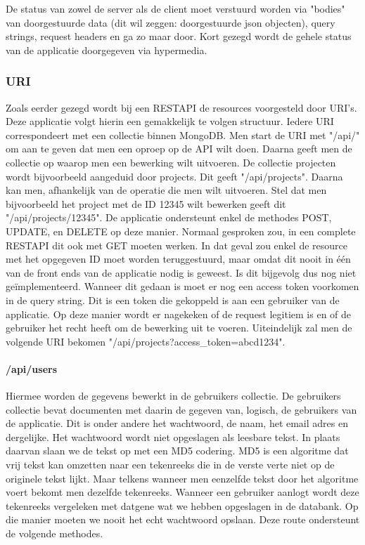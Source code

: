 \documentclass[a4paper,11pt]{article}
\begin{document}
De status van zowel de server als de client moet verstuurd worden via "bodies" van doorgestuurde data (dit wil zeggen: doorgestuurde json objecten), query strings, request headers en ga zo maar door. Kort gezegd wordt de gehele status van de applicatie doorgegeven via hypermedia.

\subsubsection{URI}
Zoals eerder gezegd wordt bij een RESTAPI de resources voorgesteld door URI's. Deze applicatie volgt hierin een gemakkelijk te volgen structuur. Iedere URI correspondeert met een collectie binnen MongoDB. Men start de URI met "/api/" om aan te geven dat men een oproep op de API wilt doen. Daarna geeft men de collectie op waarop men een bewerking wilt uitvoeren. De collectie projecten wordt bijvoorbeeld aangeduid door projects. Dit geeft "/api/projects". Daarna kan men, afhankelijk van de operatie die men wilt uitvoeren. Stel dat men bijvoorbeeld het project met de ID 12345 wilt bewerken geeft dit "/api/projects/12345". De applicatie ondersteunt enkel de methodes POST, UPDATE, en DELETE op deze manier. Normaal gesproken zou, in een complete RESTAPI dit ook met GET moeten werken. In dat geval zou enkel de resource met het opgegeven ID moet worden teruggestuurd, maar omdat dit nooit in één van de front ends van de applicatie nodig is geweest. Is dit bijgevolg dus nog niet geïmplementeerd. Wanneer dit gedaan is moet er nog een access token voorkomen in de query string. Dit is een token die gekoppeld is aan een gebruiker van de applicatie. Op deze manier wordt er nagekeken of de request legitiem is en of de gebruiker het recht heeft om de bewerking uit te voeren. Uiteindelijk zal men de volgende URI bekomen "/api/projects?access\_token=abcd1234".

\paragraph{/api/users}
Hiermee worden de gegevens bewerkt in de gebruikers collectie. De gebruikers collectie bevat documenten met daarin de gegeven van, logisch, de gebruikers van de applicatie. Dit is onder andere het wachtwoord, de naam, het email adres en dergelijke. Het wachtwoord wordt niet opgeslagen als leesbare tekst. In plaats daarvan slaan we de tekst op met een MD5 codering. MD5 is een algoritme dat vrij tekst kan omzetten naar een tekenreeks die in de verste verte niet op de originele tekst lijkt. Maar telkens wanneer men eenzelfde tekst door het algoritme voert bekomt men dezelfde tekenreeks. Wanneer een gebruiker aanlogt wordt deze tekenreeks vergeleken met datgene wat we hebben opgeslagen in de databank. Op die manier moeten we nooit het echt wachtwoord opslaan. Deze route ondersteunt de volgende methodes.
\end{document}

